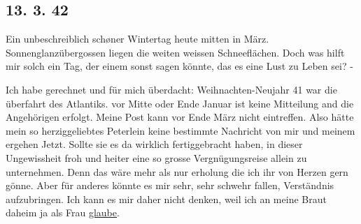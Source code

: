\subsection{13. 3. 42}

Ein unbeschreiblich schøner Wintertag heute mitten in M\"{a}rz.
Sonnenglanz\"{u}bergossen liegen die weiten weissen Schneefl\"{a}chen.
Doch was hilft mir solch ein Tag, der einem sonst sagen k\"{o}nnte, das es eine Lust zu Leben sei? -

Ich habe gerechnet und f\"{u}r mich \"{u}berdacht: Weihnachten-Neujahr 41 war die \"{u}berfahrt des Atlantiks.
vor Mitte oder Ende Januar ist keine Mitteilung and die Angeh\"{o}rigen erfolgt.
Meine Post kann vor Ende M\"{a}rz nicht eintreffen.
Also h\"{a}tte mein so herziggeliebtes Peterlein keine bestimmte Nachricht von mir und meinem ergehen Jetzt.
Sollte sie es da wirklich fertiggebracht haben, in dieser Ungewissheit froh und heiter eine so grosse Vergn\"{u}gungsreise allein zu unternehmen.
Denn das w\"{a}re mehr als nur erholung die ich ihr von Herzen gern g\"{o}nne.
Aber f\"{u}r anderes k\"{o}nnte es mir sehr, sehr schwehr fallen, Verst\"{a}ndnis aufzubringen.
Ich kann es mir daher nicht denken, weil ich an meine Braut daheim ja als Frau \ul{glaube}.

\clearpage
